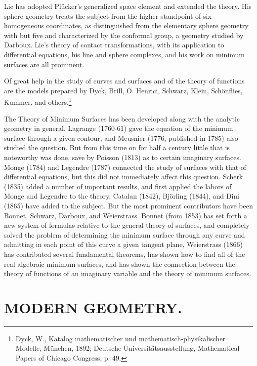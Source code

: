 \documentclass[oneside]{book}
\begin{document}
Lie has adopted Pl\"ucker's generalized space element and extended the
theory. His sphere geometry treats the subject from the higher
standpoint of six homogeneous coordinates, as distinguished from the
elementary sphere geometry with but five and characterized by the
conformal group, a geometry studied by Darboux. Lie's theory of
contact transformations, with its application to differential
equations, his line and sphere complexes, and his work on minimum
surfaces are all prominent.

Of great help in the study of curves and surfaces and of the theory
of functions are the models prepared by Dyck, Brill, O. Henrici,
Schwarz, Klein, Sch\"onflies, Kummer, and others.\footnote{Dyck,
W., Katalog mathematischer und mathematisch-physikalischer Modelle,
M\"unchen, 1892; Deutsche Universit\"atsausstellung, Mathematical
Papers of Chicago Congress, p. 49.}

The Theory of Minimum Surfaces has been developed along with the
analytic geometry in general. Lagrange (1760-61) gave the equation
of the minimum surface through a given contour, and Meusnier (1776,
published in 1785) also studied the question. But from this time on
for half a century little that is noteworthy was done, save by
Poisson (1813) as to certain imaginary surfaces. Monge (1784) and
Legendre (1787) connected the study of surfaces with that of
differential equations, but this did not immediately affect this
question. Scherk (1835) added a number of important results, and
first applied the labors of Monge and Legendre to the
theory. Catalan (1842), Bj\"orling (1844), and Dini (1865) have added
to the subject. But the most prominent contributors have been
Bonnet, Schwarz, Darboux, and Weierstrass. Bonnet (from 1853) has
set forth a new system of formulas relative to the general theory of
surfaces, and completely solved the problem of determining the
minimum surface through any curve and admitting in each point of
this curve a given tangent plane, Weierstrass (1866) has contributed
several fundamental theorems, has shown how to find all of the real
algebraic minimum surfaces, and has shown the connection between the
theory of functions of an imaginary variable and the theory of
minimum surfaces.

\chapter{MODERN GEOMETRY.}
\end{document}
